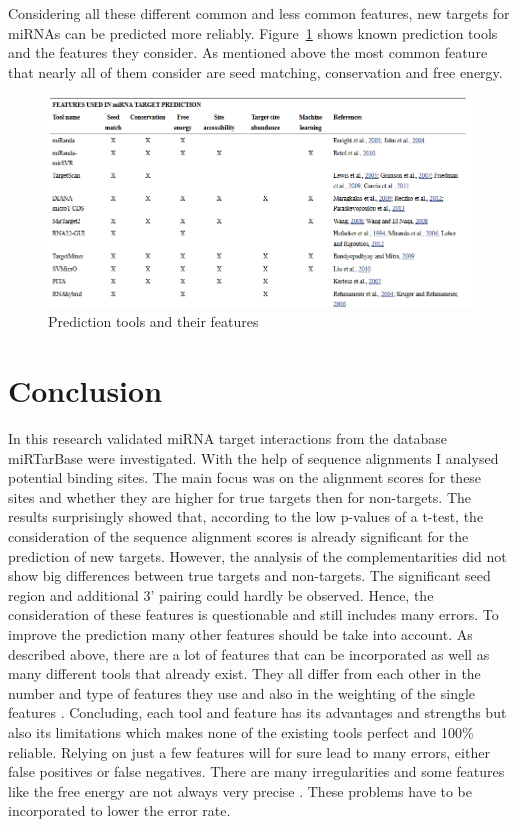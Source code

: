 \documentclass[11pt, a4paper, oneside]{book}
\begin{document}
   
Considering all these different common and less common features, new targets for miRNAs can be predicted more reliably. Figure~\ref{fig:tools} shows known prediction tools and the features they consider. As mentioned above the most common feature that nearly all of them consider are seed matching, conservation and free energy. \\


\begin{figure}
\centering
\includegraphics[width=\textwidth]{results/tools.PNG}
\caption{Prediction tools and their features}
\label{fig:tools}
\end{figure}


\vspace{2cm}



\chapter{Conclusion}
\label{chapter:conlusion}

In this research validated miRNA target interactions from the database miRTarBase were investigated. With the help of sequence alignments I analysed potential binding sites. The main focus was on the alignment scores for these sites and whether they are higher for true targets then for non-targets. The results surprisingly showed that, according to the low p-values of a t-test, the consideration of the sequence alignment scores is already significant for the prediction of new targets. However, the analysis of the complementarities did not show big differences between true targets and non-targets. The significant seed region and additional 3' pairing could hardly be observed. Hence, the consideration of these features is questionable and still includes many errors. To improve the prediction many other features should be take into account.
As described above, there are a lot of features that can be incorporated as well as many different tools that already exist. They all differ from each other in the number and type of features they use and also in the weighting of the single features \cite{Peterson}. Concluding, each tool and feature has its advantages and strengths but also its limitations which makes none of the existing tools perfect and 100\% reliable. Relying on just a few features will for sure lead to many errors, either false positives or false negatives. There are many irregularities and some features like the free energy are not always very precise \cite{Peterson}. These problems have to be incorporated to lower the error rate.\\
\end{document}
